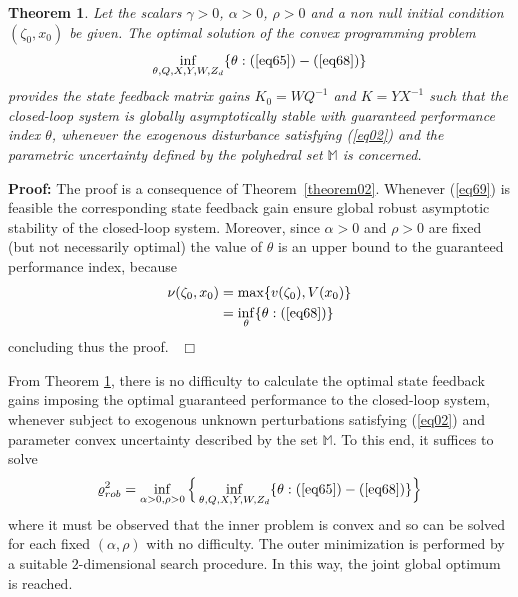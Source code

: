 \documentclass[twocolumn]{autarc_LH}
\newtheorem{theorem}{Theorem}
\newenvironment{proof}{\begin{trivlist} \item[{ \bf Proof:}] }
{~\hfill$\Box$ \end{trivlist} }
\begin{document}
\begin{theorem} \label{theorem05}
Let the scalars $\gamma>0$, $\alpha>0$, $\rho>0$ and a non null initial condition $(\zeta_0, x_0)$ be given. The optimal solution of the convex programming problem 
\begin{align}
		\label{eq69}  \inf_{\theta, Q, X, Y, W, Z_d} \{ \theta : (\ref{eq65})-(\ref{eq68}) \} 
\end{align}
provides the state feedback matrix gains $K_0 = WQ^{-1}$ and $K = Y X^{-1}$ such that the closed-loop system is globally asymptotically stable with guaranteed performance index $\theta$, whenever the exogenous disturbance satisfying (\ref{eq02}) and the parametric uncertainty defined by the polyhedral set $\mathbb{M}$ is concerned. 
\end{theorem}
\begin{proof} The proof is a consequence of  Theorem~\ref{theorem02}. Whenever (\ref{eq69}) is feasible the corresponding state feedback gain ensure global robust asymptotic stability of the closed-loop system. Moreover, since $\alpha>0$ and $\rho>0$ are fixed (but not necessarily optimal) the value of $\theta$ is an upper bound to the guaranteed performance index, because 
\begin{align}
	\label{eq70}  \nu(\zeta_0, x_0) & = \max  \{ v(\zeta_0), V(x_0) \} \nonumber \\
  & = \inf_{\theta} \{ \theta : (\ref{eq68}) \} 
\end{align}
concluding thus the proof. 
\end{proof}

From Theorem \ref{theorem05}, there is no difficulty to calculate the optimal state feedback gains imposing the optimal guaranteed performance to the closed-loop system, whenever subject to exogenous unknown perturbations satisfying (\ref{eq02}) and parameter convex uncertainty described by the set $\mathbb{M}$. To this end, it suffices to solve
\begin{align}
\label{eq71}  \varrho_{rob}^2 = \inf_{\alpha>0, \rho>0} \Big \{ \inf_{\theta, Q, X, Y, W, Z_d} \{ \theta : (\ref{eq65})-(\ref{eq68}) \} \Big \}
\end{align}
where it must be observed that the inner problem is convex and so can be solved for each fixed $(\alpha, \rho)$ with no difficulty. The outer minimization is performed by a suitable $2$-dimensional search procedure. In this way, the joint global optimum is reached. 
\end{document}
